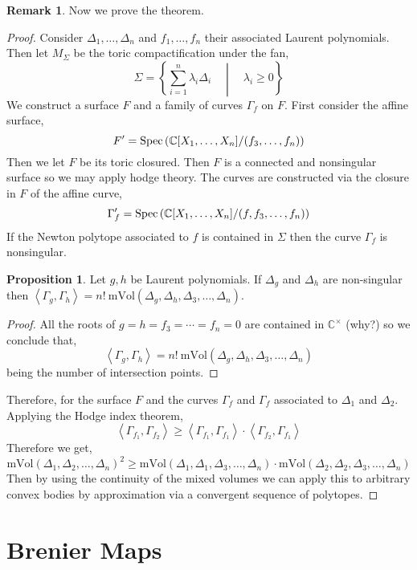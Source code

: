\documentclass[12pt]{extarticle}
\newcommand{\C}{\mathbb{C}}
\theoremstyle{definition}
\newtheorem{proposition}[theorem]{Proposition}
\newtheorem{remark}{Remark}
\newcommand{\mVol}[1]{\mathrm{mVol}\left( #1 \right)}
\newcommand{\inner}[2]{\left< #1, #2 \right>}
\begin{document}
\begin{remark}
Now we prove the theorem.
\end{remark}

\begin{proof}
Consider $\Delta_1, \dots, \Delta_n$ and $f_1, \dots, f_n$ their associated Laurent polynomials. Then let $M_\Sigma$ be the toric compactification under the fan,
\[ \Sigma = \left \{ \sum_{i = 1}^n \lambda_i \Delta_i \quad \middle| \quad \lambda_i \ge 0 \right\} \]
We construct a surface $F$ and a family of curves $\Gamma_f$ on $F$. First consider the affine surface,
\[ F' = \Spec{\C[X_1, \dots, X_n] / (f_3, \dots, f_n)} \]
Then we let $F$ be its toric closured. Then $F$ is a connected and nonsingular surface so we may apply hodge theory. The curves are constructed via the closure in $F$ of the affine curve,
\[ \Gamma_f' = \Spec{\C[X_1, \dots, X_n] / (f, f_3, \dots, f_n)} \]
If the Newton polytope associated to $f$ is contained in $\Sigma$ then the curve $\Gamma_f$ is nonsingular. 

\begin{proposition}
Let $g,h$ be Laurent polynomials. If $\Delta_g$ and $\Delta_h$ are non-singular then $\inner{\Gamma_g}{\Gamma_h} = n! \: \mVol{\Delta_g, \Delta_h, \Delta_3, \dots, \Delta_n}$. 
\end{proposition}

\begin{proof}
All the roots of $g = h = f_3 = \cdots = f_n = 0$ are contained in $\C^\times$ (why?) so we conclude that,
\[ \inner{\Gamma_g}{\Gamma_h} = n! \: \mVol{\Delta_g, \Delta_h, \Delta_3, \dots, \Delta_n} \]
being the number of intersection points. 
\end{proof}

Therefore, for the surface $F$ and the curves $\Gamma_f$ and $\Gamma_f$ associated to $\Delta_1$ and $\Delta_2$. Applying the Hodge index theorem,
\[ \inner{\Gamma_{f_1}}{\Gamma_{f_2}} \ge \inner{\Gamma_{f_1}}{\Gamma_{f_1}} \cdot \inner{\Gamma_{f_2}}{\Gamma_{f_1}} \]
Therefore we get,
\[ \mVol{\Delta_1, \Delta_2, \dots, \Delta_n}^2 \ge \mVol{\Delta_1, \Delta_1, \Delta_3, \dots, \Delta_n} \cdot \mVol{\Delta_2, \Delta_2, \Delta_3, \dots, \Delta_n} \]
Then by using the continuity of the mixed volumes we can apply this to arbitrary convex bodies by approximation via a convergent sequence of polytopes. 

\end{proof}


\section{Brenier Maps}
\end{document}
